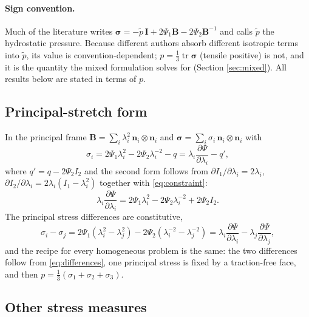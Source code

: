 \documentclass[11pt]{article}
\newcommand{\tr}{\operatorname{tr}}
\newcommand{\bn}{\bm{n}}
\newcommand{\bsig}{\bm{\sigma}}
\newcommand{\bB}{\bm{B}}
\newcommand{\bI}{\bm{I}}
\newcommand{\Ione}{I_1}
\newcommand{\Itwo}{I_2}
\newcommand{\Pone}{\Psi_{1}}
\newcommand{\Ptwo}{\Psi_{2}}
\begin{document}
\paragraph{Sign convention.}
Much of the literature writes $\bsig = -\tilde p\,\bI + 2\Pone\bB - 2\Ptwo\bB^{-1}$
and calls $\tilde p$ the hydrostatic pressure.  Because different authors
absorb different isotropic terms into $\tilde p$, its value is
convention-dependent; $p = \tfrac13\tr\bsig$ (tensile positive) is not, and
it is the quantity the mixed formulation solves for (Section
\ref{sec:mixed}).  All results below are stated in terms of $p$.

\subsection{Principal-stretch form}

In the principal frame $\bB = \sum_i\lambda_i^2\,\bn_i\otimes\bn_i$ and
$\bsig = \sum_i\sigma_i\,\bn_i\otimes\bn_i$ with
\begin{equation}
  \sigma_i = 2\Pone\lambda_i^2 - 2\Ptwo\lambda_i^{-2} - q
           = \lambda_i\frac{\partial\Psi}{\partial\lambda_i} - q' ,
  \label{eq:principal}
\end{equation}
where $q' = q - 2\Ptwo\Itwo$ and the second form follows from
$\partial\Ione/\partial\lambda_i = 2\lambda_i$,
$\partial\Itwo/\partial\lambda_i = 2\lambda_i(\Ione - \lambda_i^2)$ together
with \eqref{eq:constraint}:
\begin{equation}
  \lambda_i\frac{\partial\Psi}{\partial\lambda_i}
  = 2\Pone\lambda_i^2 - 2\Ptwo\lambda_i^{-2} + 2\Ptwo\Itwo .
\end{equation}
The principal stress differences are constitutive,
\begin{equation}
  \sigma_i - \sigma_j
  = 2\Pone(\lambda_i^2 - \lambda_j^2) - 2\Ptwo(\lambda_i^{-2} - \lambda_j^{-2})
  = \lambda_i\frac{\partial\Psi}{\partial\lambda_i}
  - \lambda_j\frac{\partial\Psi}{\partial\lambda_j},
  \label{eq:differences}
\end{equation}
and the recipe for every homogeneous problem is the same: the two
differences follow from \eqref{eq:differences}, one principal stress is
fixed by a traction-free face, and then $p = \tfrac13(\sigma_1 + \sigma_2 + \sigma_3)$.

\subsection{Other stress measures}
\end{document}
